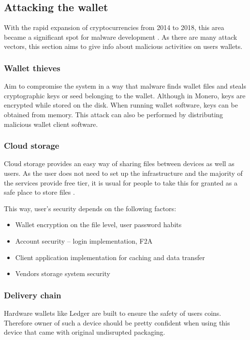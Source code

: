 \documentclass[
  printed, %
  table,   %
  nolof,     %
  nolot,     %
           oneside, color
]{fithesis3}
\begin{document}
\subsection{Attacking the wallet}
With the rapid expansion of cryptocurrencies from 2014 to 2018, this area became a significant spot for malware development \cite{schaupp2018cryptocurrency}. As there are many attack vectors, this section aims to give info about malicious activities on users wallets.

\subsubsection{Wallet thieves}

Aim to compromise the system in a way that malware finds wallet files and steals cryptographic keys or seed belonging to the wallet. Although in Monero, keys are encrypted while stored on the disk. When running wallet software, keys can be obtained from memory. This attack can also be performed by distributing malicious wallet client software.

\subsubsection{Cloud storage}

Cloud storage provides an easy way of sharing files between devices as well as users. As the user does not need to set up the infrastructure and the majority of the services provide free tier, it is usual for people to take this for granted as a safe place to store files \cite{caviglione2017covert}.

This way, user's security depends on the following factors:
\begin{itemize}\itemsep0em
\item Wallet encryption on the file level, user password habits
\item Account security -- login implementation, F2A
\item Client application implementation for caching and data transfer
\item Vendors storage system security
\end{itemize} 

\subsubsection{Delivery chain}

Hardware wallets like Ledger are built to ensure the safety of users coins. Therefore owner of such a device should be pretty confident when using this device that came with original undisrupted packaging. 
\end{document}
